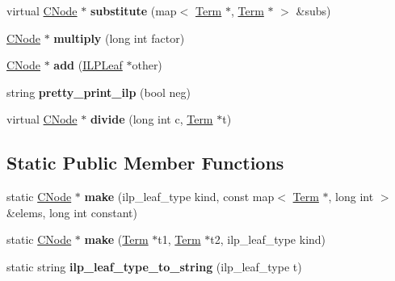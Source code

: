 \begin{DoxyCompactItemize}
\item 
\hypertarget{classILPLeaf_a4fd0cbc6c3ee5f89b7e7a1146b39b6c6}{virtual \hyperlink{classCNode}{\-C\-Node} $\ast$ {\bfseries substitute} (map$<$ \hyperlink{classTerm}{\-Term} $\ast$, \hyperlink{classTerm}{\-Term} $\ast$ $>$ \&subs)}\label{classILPLeaf_a4fd0cbc6c3ee5f89b7e7a1146b39b6c6}

\item 
\hypertarget{classILPLeaf_a1351d142419128c4da2cfde59970f5e2}{\hyperlink{classCNode}{\-C\-Node} $\ast$ {\bfseries multiply} (long int factor)}\label{classILPLeaf_a1351d142419128c4da2cfde59970f5e2}

\item 
\hypertarget{classILPLeaf_a2a2a3f3c521e9668a3b74e4914ca1819}{\hyperlink{classCNode}{\-C\-Node} $\ast$ {\bfseries add} (\hyperlink{classILPLeaf}{\-I\-L\-P\-Leaf} $\ast$other)}\label{classILPLeaf_a2a2a3f3c521e9668a3b74e4914ca1819}

\item 
\hypertarget{classILPLeaf_ae866511969891fe9d213038e900cfc25}{string {\bfseries pretty\-\_\-print\-\_\-ilp} (bool neg)}\label{classILPLeaf_ae866511969891fe9d213038e900cfc25}

\item 
\hypertarget{classILPLeaf_af1aed72a3fcf4662a7c60e240fe368cc}{virtual \hyperlink{classCNode}{\-C\-Node} $\ast$ {\bfseries divide} (long int c, \hyperlink{classTerm}{\-Term} $\ast$t)}\label{classILPLeaf_af1aed72a3fcf4662a7c60e240fe368cc}

\end{DoxyCompactItemize}
\subsection*{\-Static \-Public \-Member \-Functions}
\begin{DoxyCompactItemize}
\item 
\hypertarget{classILPLeaf_abf0eed608f5cd1950919b43883207323}{static \hyperlink{classCNode}{\-C\-Node} $\ast$ {\bfseries make} (ilp\-\_\-leaf\-\_\-type kind, const map$<$ \hyperlink{classTerm}{\-Term} $\ast$, long int $>$ \&elems, long int constant)}\label{classILPLeaf_abf0eed608f5cd1950919b43883207323}

\item 
\hypertarget{classILPLeaf_a643b96a6a598b0ab389feb2f32a91470}{static \hyperlink{classCNode}{\-C\-Node} $\ast$ {\bfseries make} (\hyperlink{classTerm}{\-Term} $\ast$t1, \hyperlink{classTerm}{\-Term} $\ast$t2, ilp\-\_\-leaf\-\_\-type kind)}\label{classILPLeaf_a643b96a6a598b0ab389feb2f32a91470}

\item 
\hypertarget{classILPLeaf_a115dddc2676faf2f1322c27ab2ac57d0}{static string {\bfseries ilp\-\_\-leaf\-\_\-type\-\_\-to\-\_\-string} (ilp\-\_\-leaf\-\_\-type t)}\label{classILPLeaf_a115dddc2676faf2f1322c27ab2ac57d0}

\end{DoxyCompactItemize}
